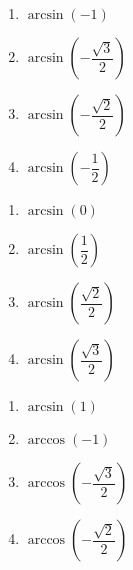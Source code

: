\begin{multicols}{4} 

\begin{enumerate}

\item $\arcsin \left( -1 \right)$  \label{exactvaluearcfirst}
\item $\arcsin \left( -\dfrac{\sqrt{3}}{2} \right)$
\item $\arcsin \left( -\dfrac{\sqrt{2}}{2} \right)$
\item $\arcsin \left( -\dfrac{1}{2} \right)$ 

\setcounter{HW}{\value{enumi}}

\end{enumerate}

\end{multicols}

\begin{multicols}{4}

\begin{enumerate}

\setcounter{enumi}{\value{HW}}

\item $\arcsin \left( 0 \right)$ 
\item $\arcsin \left( \dfrac{1}{2} \right)$ 
\item $\arcsin \left( \dfrac{\sqrt{2}}{2} \right)$
\item $\arcsin \left( \dfrac{\sqrt{3}}{2} \right)$

\setcounter{HW}{\value{enumi}}

\end{enumerate}

\end{multicols}

\begin{multicols}{4}

\begin{enumerate}

\setcounter{enumi}{\value{HW}}

\item $\arcsin \left( 1 \right)$ 
\item $\arccos \left( -1 \right)$ 
\item $\arccos \left( -\dfrac{\sqrt{3}}{2} \right)$
\item $\arccos \left( -\dfrac{\sqrt{2}}{2} \right)$

\setcounter{HW}{\value{enumi}}

\end{enumerate}

\end{multicols}

